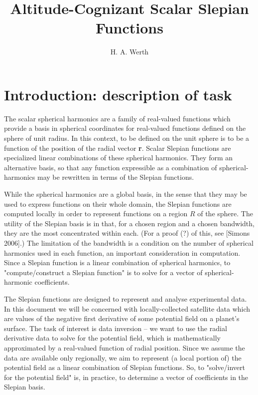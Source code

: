 \documentclass{article}
\title{Altitude-Cognizant Scalar Slepian Functions}
\author{H. A. Werth}
\date{}
\begin{document}
\maketitle

\tableofcontents 


\section{Introduction: description of task}

The scalar spherical harmonics are a family of real-valued functions which provide a basis in spherical coordinates for real-valued functions defined on the sphere of unit radius. In this context, to be defined on the unit sphere is to be a function of the position of the radial vector \textbf{r}. Scalar Slepian functions are specialized linear combinations of these spherical harmonics. They form an alternative basis, so that any function expressible as a combination of spherical-harmonics may be rewritten in terms of the Slepian functions. 

While the spherical harmonics are a global basis, in the sense that they may be used to express functions on their whole domain, the Slepian functions are computed locally in order to represent functions on a region $R$ of the sphere. The utility of the Slepian basis is in that, for a chosen region and a chosen bandwidth, they are the most concentrated within each. (For a proof (?) of this, see [Simons 2006].) The limitation of the bandwidth is a condition on the number of spherical harmonics used in each function, an important consideration in computation. Since a Slepian function is a linear combination of spherical harmonics, to "compute/construct a Slepian function" is to solve for a vector of spherical-harmonic coefficients.

The Slepian functions are designed to represent and analyse experimental data. In this document we will be concerned with locally-collected satellite data which are values of the negative first derivative of some potential field on a planet's surface. The task of interest is data inversion -- we want to use the radial derivative data to solve for the potential field, which is mathematically approximated by a real-valued function of radial position. Since we assume the data are available only regionally, we aim to represent (a local portion of) the potential field as a linear combination of Slepian functions. So, to "solve/invert for the potential field" is, in practice, to determine a vector of coefficients in the Slepian basis.
\end{document}
